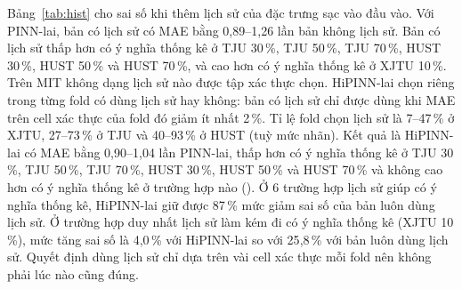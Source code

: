 Bảng~\ref{tab:hist} cho sai số khi thêm lịch sử của đặc trưng sạc vào đầu vào. Với PINN-lai, bản có lịch sử có MAE bằng 0{,}89--1{,}26 lần bản không lịch sử. Bản có lịch sử thấp hơn có ý nghĩa thống kê ở TJU 30\,\%, TJU 50\,\%, TJU 70\,\%, HUST 30\,\%, HUST 50\,\% và HUST 70\,\%, và cao hơn có ý nghĩa thống kê ở XJTU 10\,\%. Trên MIT không dạng lịch sử nào được tập xác thực chọn. HiPINN-lai chọn riêng trong từng fold có dùng lịch sử hay không: bản có lịch sử chỉ được dùng khi MAE trên cell xác thực của fold đó giảm ít nhất 2\,\%. Tỉ lệ fold chọn lịch sử là 7--47\,\% ở XJTU, 27--73\,\% ở TJU và 40--93\,\% ở HUST (tuỳ mức nhãn). Kết quả là HiPINN-lai có MAE bằng 0{,}90--1{,}04 lần PINN-lai, thấp hơn có ý nghĩa thống kê ở TJU 30\,\%, TJU 50\,\%, TJU 70\,\%, HUST 30\,\%, HUST 50\,\% và HUST 70\,\% và không cao hơn có ý nghĩa thống kê ở trường hợp nào (). Ở 6 trường hợp lịch sử giúp có ý nghĩa thống kê, HiPINN-lai giữ được 87\,\% mức giảm sai số của bản luôn dùng lịch sử. Ở trường hợp duy nhất lịch sử làm kém đi có ý nghĩa thống kê (XJTU 10\,\%), mức tăng sai số là 4{,}0\,\% với HiPINN-lai so với 25{,}8\,\% với bản luôn dùng lịch sử. Quyết định dùng lịch sử chỉ dựa trên vài cell xác thực mỗi fold nên không phải lúc nào cũng đúng.

